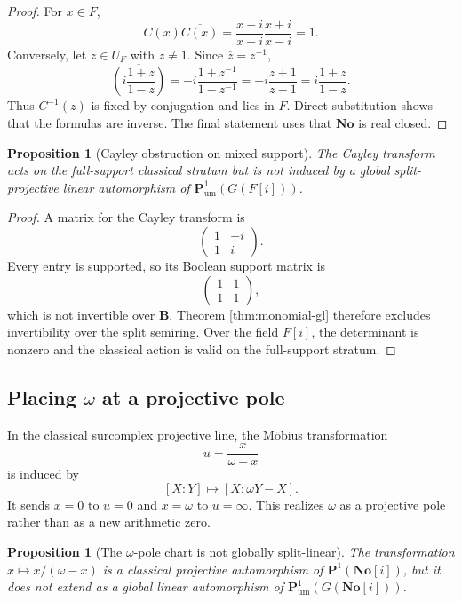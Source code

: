 \documentclass[11pt]{amsart}
\numberwithin{equation}{section}
\newtheorem{proposition}[theorem]{Proposition}
\theoremstyle{definition}
\newcommand{\B}{\mathbf B}
\newcommand{\No}{\mathbf{No}}
\newcommand{\Pum}{\mathbf P_{\mathrm{um}}}
\begin{document}
\begin{proof}
For $x\in F$,
\[
C(x)\overline{C(x)}
=
\frac{x-i}{x+i}\frac{x+i}{x-i}=1.
\]
Conversely, let $z\in U_F$ with $z\neq1$.  Since $\overline z=z^{-1}$,
\[
\overline{\left(i\frac{1+z}{1-z}\right)}
=
-i\frac{1+z^{-1}}{1-z^{-1}}
=
-i\frac{z+1}{z-1}
=
i\frac{1+z}{1-z}.
\]
Thus $C^{-1}(z)$ is fixed by conjugation and lies in $F$.  Direct substitution shows that the formulas are inverse.  The final statement uses that $\No$ is real closed.
\end{proof}

\begin{proposition}[Cayley obstruction on mixed support]\label{prop:cayley-obstruction}
The Cayley transform acts on the full-support classical stratum but is not induced by a global split-projective linear automorphism of $\Pum^1(G(F[i]))$.
\end{proposition}

\begin{proof}
A matrix for the Cayley transform is
\[
\begin{pmatrix}
1&-i\\
1&i
\end{pmatrix}.
\]
Every entry is supported, so its Boolean support matrix is
\[
\begin{pmatrix}
1&1\\
1&1
\end{pmatrix},
\]
which is not invertible over $\B$.  Theorem \ref{thm:monomial-gl} therefore excludes invertibility over the split semiring.  Over the field $F[i]$, the determinant is nonzero and the classical action is valid on the full-support stratum.
\end{proof}

\subsection{Placing \texorpdfstring{$\omega$}{omega} at a projective pole}

In the classical surcomplex projective line, the M\"obius transformation
\[
u=\frac{x}{\omega-x}
\]
is induced by
\[
[X:Y]\longmapsto[X:\omega Y-X].
\]
It sends $x=0$ to $u=0$ and $x=\omega$ to $u=\infty$.  This realizes $\omega$ as a projective pole rather than as a new arithmetic zero.

\begin{proposition}[The $\omega$-pole chart is not globally split-linear]\label{prop:omega-pole-obstruction}
The transformation $x\mapsto x/(\omega-x)$ is a classical projective automorphism of $\mathbf P^1(\No[i])$, but it does not extend as a global linear automorphism of $\Pum^1(G(\No[i]))$.
\end{proposition}
\end{document}
